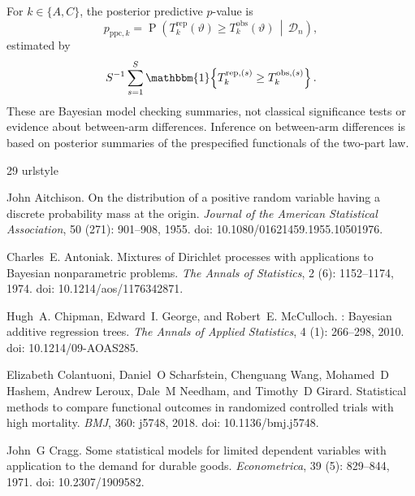 \documentclass[11pt]{article}
\DeclareMathOperator{\Prob}{P}
\begin{document}
For \(k\in\{A,C\}\), the posterior predictive $p$-value is
\[
  p_{\mathrm{ppc},k}
  =
  \Prob\!\left(
    T_k^{\mathrm{rep}}(\vartheta)
    \geq
    T_k^{\mathrm{obs}}(\vartheta)
    \,\middle|\,
    \mathcal{D}_n
  \right),
\]
estimated by
\[
  S^{-1}\sum_{s=1}^S
  \mathbbm{1}\!\left\{
    T_k^{\mathrm{rep},(s)}
    \geq
    T_k^{\mathrm{obs},(s)}
  \right\}.
\]
These are Bayesian model checking summaries, not classical significance tests
or evidence about between-arm differences. Inference on between-arm differences
is based on posterior summaries of the prespecified functionals of the two-part
law.
\fi
\clearpage

\begin{thebibliography}{29}
\providecommand{\natexlab}[1]{#1}
\providecommand{\url}[1]{\texttt{#1}}
\expandafter\ifx\csname urlstyle\endcsname\relax
  \providecommand{\doi}[1]{doi: #1}\else
  \providecommand{\doi}{doi: \begingroup \urlstyle{rm}\Url}\fi

John Aitchison.
\newblock On the distribution of a positive random variable having a discrete
  probability mass at the origin.
\newblock \emph{Journal of the American Statistical Association}, 50
  (271): 901--908, 1955.
\newblock \doi{10.1080/01621459.1955.10501976}.

Charles~E. Antoniak.
\newblock Mixtures of {D}irichlet processes with applications to {B}ayesian
  nonparametric problems.
\newblock \emph{The Annals of Statistics}, 2 (6): 1152--1174,
  1974.
\newblock \doi{10.1214/aos/1176342871}.

Hugh~A. Chipman, Edward~I. George, and Robert~E. McCulloch.
: {B}ayesian additive regression trees.
\newblock \emph{The Annals of Applied Statistics}, 4 (1):
  266--298, 2010.
\newblock \doi{10.1214/09-AOAS285}.

Elizabeth Colantuoni, Daniel~O Scharfstein, Chenguang Wang, Mohamed~D Hashem,
  Andrew Leroux, Dale~M Needham, and Timothy~D Girard.
\newblock Statistical methods to compare functional outcomes in randomized
  controlled trials with high mortality.
\newblock \emph{BMJ}, 360: j5748, 2018.
\newblock \doi{10.1136/bmj.j5748}.

John~G Cragg.
\newblock Some statistical models for limited dependent variables with
  application to the demand for durable goods.
\newblock \emph{Econometrica}, 39 (5): 829--844, 1971.
\newblock \doi{10.2307/1909582}.


\end{thebibliography}
\end{document}
